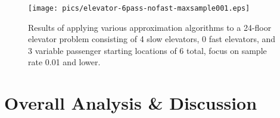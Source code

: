 \begin{figure}
\begin{center}
\texttt{[image: pics/elevator-6pass-nofast-maxsample001.eps]}
\caption{Results of applying various approximation algorithms to a 24-floor elevator problem consisting of 4 slow elevators, 0 fast elevators, and 3 variable passenger starting locations of 6 total, focus on sample rate 0.01 and lower.}
\label{fig:elevator-6pass-nofast-maxsample001}
\end{center}
\end{figure}







\section{Overall Analysis \& Discussion}


